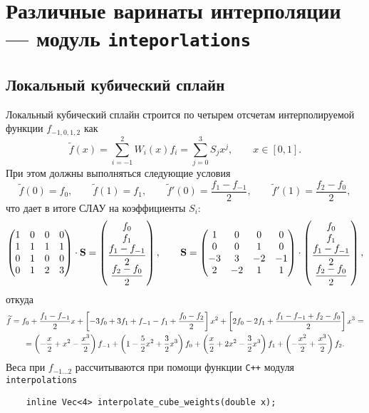 \section{Различные варинаты интерполяции --- модуль {\tt inteporlations}}\label{interpolations:sec}
\subsection{Локальный кубический сплайн}
Локальный кубический сплайн строится по четырем отсчетам интерполируемой функции $f_{-1,0,1,2}$
как
$$
\widetilde f(x) = \sum\limits_{i=-1}^2 W_i(x) f_i = \sum_{j=0}^3 S_j x^j, \qquad x\in[0,1].
$$
При этом должны выполняться следующие условия
$$
\widetilde f(0) = f_0, \qquad
\widetilde f(1) = f_1, \qquad
\widetilde f'(0)  = \frac{f_1-f_{-1}}2, \qquad
\widetilde f'(1)  = \frac{f_2-f_{0}}2, 
$$
что дает в итоге СЛАУ на коэффициенты $S_i$:
$$
\left(
\begin{matrix}
  1 & 0 & 0 & 0 \\
  1 & 1 & 1 & 1 \\
  0 & 1 & 0 & 0 \\
  0 & 1 & 2 & 3 \\
\end{matrix}
\right)\cdot {\bf S} = \left(
\begin{matrix}
f_0 \\ f_1 \\ \displaystyle\frac{f_1-f_{-1}}2 \\  \displaystyle\frac{f_2-f_{0}}2
\end{matrix}
\right),
\qquad
{\bf S} = \left(
\begin{matrix}
  1 & 0 & 0 & 0 \\
  0 & 0 & 1 & 0 \\
  -3 & 3 & -2 & -1 \\
  2 & -2 & 1 & 1 \\
\end{matrix}
\right)\cdot \left(
\begin{matrix}
f_0 \\ f_1 \\ \displaystyle\frac{f_1-f_{-1}}2 \\  \displaystyle\frac{f_2-f_{0}}2
\end{matrix}
\right),
$$
откуда
\begin{multline}
\widetilde f = f_0 + \frac{f_1-f_{-1}}2 x + \left[-3 f_0 + 3 f_1 + f_{-1} - f_1 + \frac{f_0-f_2}2 \right] x^2
+ \left[2f_0 -2f_1 + \frac{f_1 - f_{-1} + f_2-f_0}2 \right] x^3
=\\=
\left(-\frac x2 + x^2 -\frac{x^3}2\right)f_{-1}
+\left(1-\frac52 x^2+ \frac 32x^3\right)f_0
+\left(\frac x2 + 2x^2 - \frac32 x^3 \right)f_1
+\left(-\frac{x^2}2 + \frac{x^3}2 \right)f_2.
\notag
\end{multline}
Веса при $f_{-1...2}$ рассчитываются при помощи функции \verb'C++' модуля \verb'interpolations'
\begin{verbatim}
    inline Vec<4> interpolate_cube_weights(double x);
\end{verbatim}

